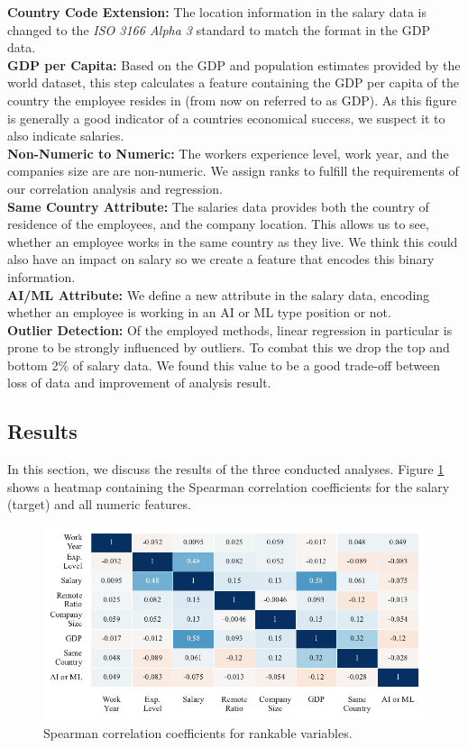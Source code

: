 \documentclass{article}
\begin{document}
\textbf{Country Code Extension:}
The location information in the salary data is changed to the \textit{ISO 3166 Alpha 3} standard to match the format in the GDP data. \\
\textbf{GDP per Capita:}
Based on the GDP and population estimates provided by the world dataset, this step calculates a feature containing the GDP per capita of the country the employee resides in (from now on referred to as GDP). As this figure is generally a good indicator of a countries economical success, we suspect it to also indicate salaries.\\
\textbf{Non-Numeric to Numeric:}
The workers experience level, work year, and the companies size are are non-numeric. We assign ranks to fulfill the requirements of our correlation analysis and regression.\\
\textbf{Same Country Attribute:}
The salaries data provides both the country of residence of the employees, and the company location. This allows us to see, whether an employee works in the same country as they live. We think this could also have an impact on salary so we create a feature that encodes this binary information.\\
\textbf{AI/ML Attribute:}
We define a new attribute in the salary data, encoding whether an employee is working in an AI or ML type position or not.\\
\textbf{Outlier Detection:}
Of the employed methods, linear regression in particular is prone to be strongly influenced by outliers. To combat this we drop the top and bottom 2\% of salary data. We found this value to be a good trade-off between loss of data and improvement of analysis result.

\subsection{Results}
In this section, we discuss the results of the three conducted analyses. Figure \ref{fig:correlation} shows a heatmap containing the Spearman correlation coefficients for the salary (target) and all numeric features.

\begin{figure}[ht]
    \hspace*{-.2cm}
    \centering
    \includegraphics{correlation.pdf}
    \caption{Spearman correlation coefficients for rankable variables.}
    \label{fig:correlation}
\end{figure}
\end{document}
